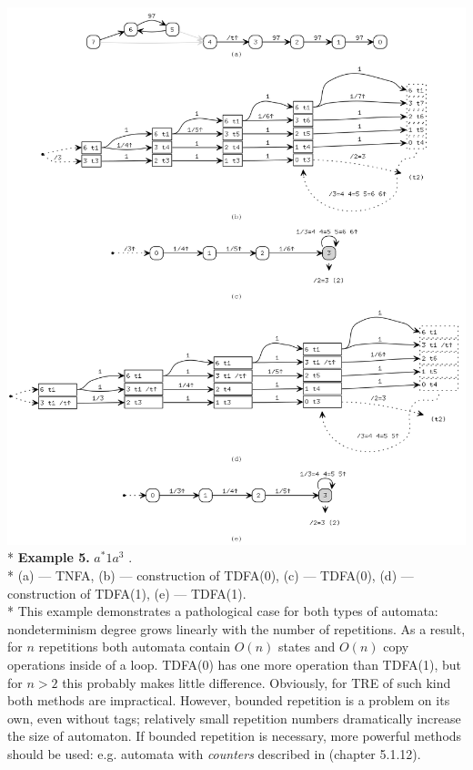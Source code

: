 \documentclass{article}
\newenvironment{Xfig}
    {\par\medskip\noindent\minipage{\linewidth}\begin{center}}
    {\end{center}\endminipage\par\medskip}
\theoremstyle{definition}
\begin{document}
\begin{Xfig}
\includegraphics[width=0.9\linewidth]{img/example3/all.png}\\*
\textbf{Example 5.} $a^* 1 a^{3}$ .\\*
(a) --- TNFA, (b) --- construction of TDFA(0), (c) --- TDFA(0), (d) --- construction of TDFA(1), (e) --- TDFA(1).\\*
This example demonstrates a pathological case for both types of automata:
nondeterminism degree grows linearly with the number of repetitions.
As a result, for $n$ repetitions both automata contain $O(n)$ states and $O(n)$ copy operations inside of a loop.
TDFA(0) has one more operation than TDFA(1), but for $n \!>\! 2$ this probably makes little difference.
Obviously, for TRE of such kind both methods are impractical.
However, bounded repetition is a problem on its own, even without tags;
relatively small repetition numbers dramatically increase the size of automaton.
If bounded repetition is necessary, more powerful methods should be used:
e.g. automata with \emph{counters} described in \cite{Bec09} (chapter 5.1.12).
\end{Xfig}
\end{document}
